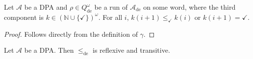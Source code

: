 \begin{lem}
\label{lem:fritzwilke:k_shrink}
	Let $\mathcal{A}$ be a DPA and $\rho \in Q_\text{de}^\omega$ be a run of $\mathcal{A}_\text{de}$ on some word, where the third component is $k \in (\mathbb{N} \cup \{\checkmark\})^\omega$. For all $i$, $k(i+1) \leq_\checkmark k(i)$ or $k(i+1) = \checkmark$.
\end{lem}

\begin{proof}
	Follows directly from the definition of $\gamma$.
\end{proof}

\begin{lem}
\label{lem:fritzwilke:de_order_reftran}
	Let $\mathcal{A}$ be a DPA. Then $\leq_\text{de}$ is reflexive and transitive.
\end{lem}

